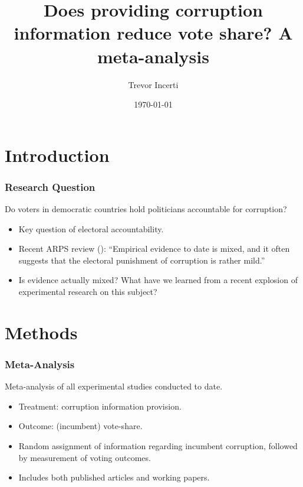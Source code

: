 \documentclass[usenames,dvipsnames]{beamer}
\title{Does providing corruption information reduce vote share? A meta-analysis}
\date{\today}
\author{Trevor Incerti}
\begin{document}
\maketitle


\section{Introduction}

\begin{frame}
\frametitle{Research Question}
Do voters in democratic countries hold politicians accountable for corruption?
\pause
\begin{itemize}
\item Key question of electoral accountability. 
\pause
\item Recent ARPS review (\citet{de2017electoral}): ``Empirical evidence to date is \textcolor{Cerulean}{mixed}, and it often suggests that the electoral punishment of corruption is rather mild.'' 
\pause
\item Is evidence actually mixed? What have we learned from a recent explosion of experimental research on this subject?
\end{itemize}
\end{frame}


\section{Methods}

\begin{frame}
\frametitle{Meta-Analysis}
Meta-analysis of all \textcolor{Cerulean}{experimental} studies conducted to date. 
\pause
\begin{itemize}
\item \textcolor{Cerulean}{Treatment}: corruption information provision. 
\pause
\item \textcolor{Cerulean}{Outcome}: (incumbent) vote-share.
\pause
\item Random assignment of information regarding incumbent corruption, followed by measurement of voting outcomes.
\pause
\item Includes both \textcolor{Cerulean}{published articles and working papers}.
\end{itemize}
\end{frame}

\end{document}
